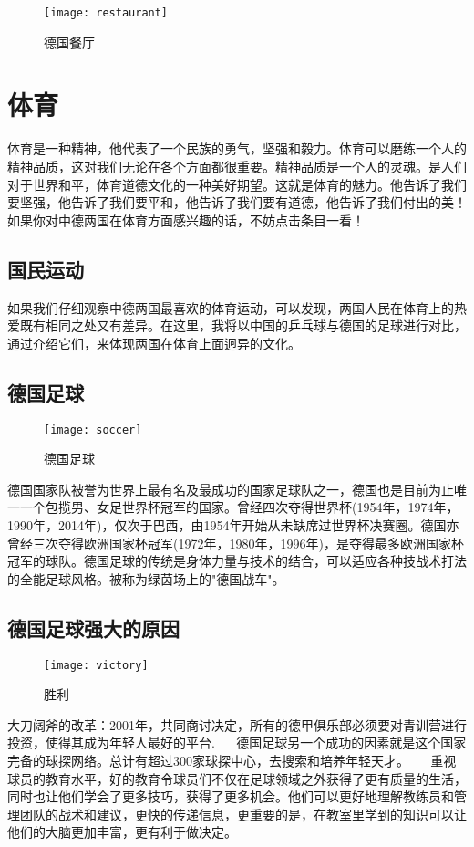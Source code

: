 \begin{figure}[htb]
    \centering
    \texttt{[image: restaurant]}
    \caption{德国餐厅}
\end{figure} 



\section{体育}
    体育是一种精神，他代表了一个民族的勇气，坚强和毅力。体育可以磨练一个人的精神品质，这对我们无论在各个方面都很重要。精神品质是一个人的灵魂。是人们对于世界和平，体育道德文化的一种美好期望。这就是体育的魅力。他告诉了我们要坚强，他告诉了我们要平和，他告诉了我们要有道德，他告诉了我们付出的美！如果你对中德两国在体育方面感兴趣的话，不妨点击条目一看！

\subsection{国民运动}
    如果我们仔细观察中德两国最喜欢的体育运动，可以发现，两国人民在体育上的热爱既有相同之处又有差异。在这里，我将以中国的乒乓球与德国的足球进行对比，通过介绍它们，来体现两国在体育上面迥异的文化。

\subsection{德国足球}
\begin{figure}[htb]
    \centering
    \texttt{[image: soccer]}
    \caption{德国足球}
\end{figure}

    德国国家队被誉为世界上最有名及最成功的国家足球队之一，德国也是目前为止唯一一个包揽男、女足世界杯冠军的国家。曾经四次夺得世界杯(1954年，1974年，1990年，2014年)，仅次于巴西，由1954年开始从未缺席过世界杯决赛圈。德国亦曾经三次夺得欧洲国家杯冠军(1972年，1980年，1996年)，是夺得最多欧洲国家杯冠军的球队。德国足球的传统是身体力量与技术的结合，可以适应各种技战术打法的全能足球风格。被称为绿茵场上的"德国战车"。 

\subsection{德国足球强大的原因}
\begin{figure}[htb]
    \centering
    \texttt{[image: victory]}
    \caption{胜利}
\end{figure}

    大刀阔斧的改革：2001年，共同商讨决定，所有的德甲俱乐部必须要对青训营进行投资，使得其成为年轻人最好的平台. 
    
    德国足球另一个成功的因素就是这个国家完备的球探网络。总计有超过300家球探中心，去搜索和培养年轻天才。 
    
    重视球员的教育水平，好的教育令球员们不仅在足球领域之外获得了更有质量的生活，同时也让他们学会了更多技巧，获得了更多机会。他们可以更好地理解教练员和管理团队的战术和建议，更快的传递信息，更重要的是，在教室里学到的知识可以让他们的大脑更加丰富，更有利于做决定。 

